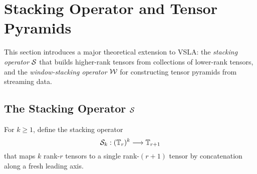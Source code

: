 \section{Stacking Operator and Tensor Pyramids}
\label{sec:stacking}

This section introduces a major theoretical extension to VSLA: the \emph{stacking operator} $\mathcal{S}$ that builds higher-rank tensors from collections of lower-rank tensors, and the \emph{window-stacking operator} $\mathcal{W}$ for constructing tensor pyramids from streaming data.

\subsection{The Stacking Operator $\mathcal{S}$}

\begin{definition}
\label{def:stacking}
For $k \geq 1$, define the stacking operator
\[
\mathcal{S}_k : (\mathbb{T}_r)^k \longrightarrow \mathbb{T}_{r+1}
\]
that maps $k$ rank-$r$ tensors to a single rank-$(r+1)$ tensor by concatenation along a fresh leading axis.
\end{definition}

